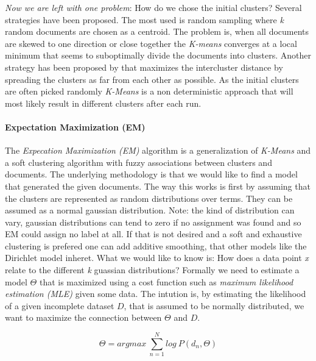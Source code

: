     \emph{Now we are left with one problem}: How do we chose the initial clusters? Several strategies have been proposed. The most used is random sampling where \emph{k} random documents are chosen as a centroid. The problem is, when all documents are skewed to one direction or close together the \emph{K-means} converges at a local minimum that seems to suboptimally divide the documents into clusters.
    Another strategy has been proposed by \cite{KMeansPlusPlus2007} that maximizes the intercluster distance by spreading the clusters as far from each other as possible. 
    As the initial clusters are often picked randomly \emph{K-Means} is a non deterministic approach that will most likely result in different clusters after each run.

    \paragraph{Expectation Maximization (EM)}
    The \emph{Expecation Maximization (EM)} algorithm is a generalization of \emph{K-Means} and a soft clustering algorithm with fuzzy associations between clusters and documents. The underlying methodology is that we would like to find a model that generated the given documents. The way this works is first by assuming that the clusters are represented as random distributions over terms. They can be assumed as a normal gaussian distribution. Note: the kind of distribution can vary, gaussian distributions can tend to zero if no assignment was found and so EM could assign no label at all. If that is not desired and a soft and exhaustive clustering is prefered one can add additive smoothing, that other models like the Dirichlet model inheret. What we would like to know is: How does a data point \emph{x} relate to the different \emph{k} guassian distributions? Formally we need to estimate a model $\Theta$ that is maximized using a cost function such as \emph{maximum likelihood estimation (MLE)} given some data. The intution is, by estimating the likelihood of a given incomplete dataset $D$, that is assumed to be normally distributed, we want to maximize the connection between $\Theta$ and $D$.

      \begin{equation}
        \Theta = argmax\:\sum_{n=1}^{N}log\:P(d_n,\Theta)
      \end{equation}

